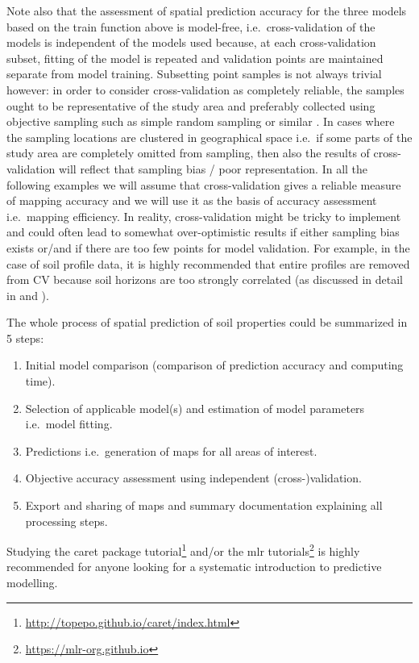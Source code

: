 \documentclass[graybox,natbib,nospthms,UStrade]{svmono}
\providecommand{\tightlist}{%
  \setlength{\itemsep}{0pt}\setlength{\parskip}{0pt}}
\providecommand{\tightlist}{\setlength{\itemsep}{0pt}\setlength{\parskip}{0pt}}
\renewcommand{\href}[2]{#2 (\url{#1})}
\renewcommand{\href}[2]{#2\footnote{\url{#1}}}
\begin{document}
Note also that the assessment of spatial prediction accuracy for the three models based on the train function above is model-free, i.e.~cross-validation of the models is independent of the models used because, at each cross-validation subset, fitting of the model is repeated and validation points are maintained separate from model training. Subsetting point samples is not always trivial however: in order to consider cross-validation as completely reliable, the samples ought to be representative of the study area and preferably collected using objective sampling such as simple random sampling or similar \citep{Brus2011EJSS}. In cases where the sampling locations are clustered in geographical space i.e.~if some parts of the study area are completely omitted from sampling, then also the results of cross-validation will reflect that sampling bias / poor representation. In all the following examples we will assume that cross-validation gives a reliable measure of mapping accuracy and we will use it as the basis of accuracy assessment i.e.~mapping efficiency. In reality, cross-validation might be tricky to implement and could often lead to somewhat over-optimistic results if either sampling bias exists or/and if there are too few points for model validation. For example, in the case of soil profile data, it is highly recommended that entire profiles are removed from CV because soil horizons are too strongly correlated (as discussed in detail in \citet{Gasch2015SPASTA} and \citet{Brenning2012}).

The whole process of spatial prediction of soil properties could be summarized in 5 steps:

\begin{enumerate}
\def\labelenumi{\arabic{enumi}.}
\tightlist
\item
  Initial model comparison (comparison of prediction accuracy and computing time).
\item
  Selection of applicable model(s) and estimation of model parameters i.e.~model fitting.
\item
  Predictions i.e.~generation of maps for all areas of interest.
\item
  Objective accuracy assessment using independent (cross-)validation.
\item
  Export and sharing of maps and summary documentation explaining all processing steps.
\end{enumerate}

Studying the \href{http://topepo.github.io/caret/index.html}{caret package tutorial}
and/or the \href{https://mlr-org.github.io}{mlr tutorials} is highly recommended for anyone looking
for a systematic introduction to predictive modelling.
\end{document}
